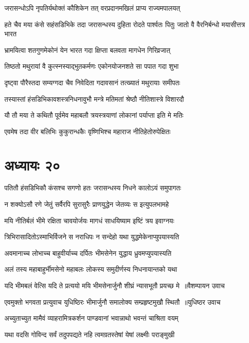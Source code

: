 \twolineshloka
{जरासन्धोऽपि नृपतिर्यथोक्तं कौशिकेन तत्}
{वरप्रदानमखिलं प्राप्य राज्यमपालयत्}


\threelineshloka
{हते चैव मया कंसे सहंसडिभिके तदा}
{जरासन्धस्य दुहिता रोदते पार्श्वतः पितुः}
{जातो वै वैरनिर्बन्धो मयासीत्तत्र भारत}


\twolineshloka
{भ्रामयित्वा शतगुणमेकोनं येन भारत}
{गदा क्षिप्ता बलवता मागधेन गिरिव्रजात्}


\twolineshloka
{तिष्ठतो मथुरायां वै कुत्स्नस्याद्भुतकर्मणः}
{एकोनयोजनशते सा पपात गदा शुभा}


\twolineshloka
{दृष्ट्वा पौरैस्तदा सम्यग्गदा चैव निवेदिता}
{गदावसानं तत्ख्यातं मथुरायाः समीपतः}


\twolineshloka
{तस्यास्तां हंसडिभिकावशस्त्रनिधनावुभौ}
{मन्त्रे मतिमतां श्रेष्ठौ नीतिशास्त्रे विशारदौ}


\twolineshloka
{यौ तौ मया ते कथितौ पूर्वमेव महाबलौ}
{त्रयस्त्रयाणां लोकानां पर्याप्ता इति मे मतिः}


\twolineshloka
{एवमेष तदा वीर बलिभिः कुकुरान्धकैः}
{वृष्णिभिश्च महाराज नीतिहेतोरुपेक्षितः}


\chapter{अध्यायः २०}
\twolineshloka
{पतितौ हंसडिभिकौ कंसश्च सगणो हतः}
{जरासन्धस्य निधने कालोऽयं समुपागतः}


\twolineshloka
{न शक्योऽसौ रणे जेतुं सर्वैरपि सुरासुरैः}
{प्राणयुद्धेन जेतव्यः स इत्युपलभामहे}


\twolineshloka
{मयि नीतिर्बलं भीमे रक्षिता चावयोर्जयः}
{मागधं साधयिष्याम इष्टिं त्रय इवाग्नयः}


\twolineshloka
{त्रिभिरासादितोऽस्माभिर्विजने स नराधिपः}
{न सन्देहो यथा युद्धमेकेनाप्युपयास्यति}


\twolineshloka
{अवमानाच्च लोभाच्च बाहुवीर्याच्च दर्पितः}
{भीमसेनेन युद्धाय ध्रुवमप्युपयास्यति}


\twolineshloka
{अलं तस्य महाबाहुर्भीमसेनो महाबलः}
{लोकस्य समुदीर्णस्य निधनायान्तको यथा}


\twolineshloka
{यदि भीमबलं वेत्सि यदि ते प्रत्ययो मयि}
{भीमसेनार्जुनौ शीघ्रं न्यासभूतौ प्रयच्छ मे ॥वैशम्पायन उवाच}


\threelineshloka
{एवमुक्तो भगवता प्रत्युवाच युधिष्ठिरः}
{भीमार्जुनौ समालोक्य सम्प्रहृष्टमुखौ स्थितौ ॥युधिष्ठर उवाच}
{}


\twolineshloka
{अच्युताच्युत मामैवं व्याहरामित्रकर्शन}
{पाण्डवानां भवान्नाथो भवन्तं चाश्रिता वयम्}


\twolineshloka
{यथा वदसि गोविन्द सर्वं तदुपपद्यते}
{नहि त्वमग्रतस्तेषां येषां लक्ष्मीः पराङ्मुखी}


